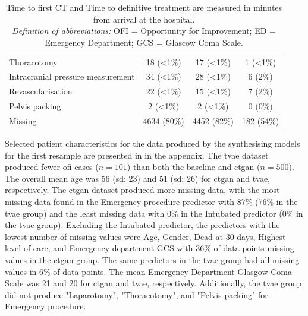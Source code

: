 \documentclass[12pt, a4paper]{article}
\begin{document}
\begin{table}[p]
{\begin{tabular}{lccc}
            \hspace{3mm}Thoracotomy                       & 18 (\textless1\%) & 17 (\textless1\%) & 1 (\textless1\%) \\
            \hspace{3mm}Intracranial pressure measurement & 34 (\textless1\%) & 28 (\textless1\%) & 6 (2\%)          \\
            \hspace{3mm}Revascularisation                 & 22 (\textless1\%) & 15 (\textless1\%) & 7 (2\%)          \\
            \hspace{3mm}Pelvis packing                    & 2 (\textless1\%)  & 2 (\textless1\%)  & 0 (0\%)          \\
            \hspace{3mm}Missing                           & 4634 (80\%)       & 4452 (82\%)       & 182 (54\%)       \\
            \bottomrule
        \end{tabular}
    }
    \caption*{\small Time to first CT and Time to definitive treatment are measured in minutes from arrival at the hospital.\\
        \textit{Definition of abbreviations:} OFI = Opportunity for Improvement; ED = Emergency Department; GCS = Glascow Coma Scale.}
\end{table}

Selected patient characteristics for the data produced by the synthesising models for the first resample are presented in  in the appendix. The \acrshort{tvae} dataset produced fewer \acrshort{ofi} cases ($n=101$) than both the baseline and \acrshort{ctgan} ($n=500$). The overall mean age was 56 (\acrshort{sd}: 23) and 51 (\acrshort{sd}: 26) for \acrshort{ctgan} and \acrshort{tvae}, respectively. The \acrshort{ctgan} dataset produced more missing data, with the most missing data found in the Emergency procedure predictor with 87\% (76\% in the \acrshort{tvae} group) and the least missing data with 0\% in the Intubated predictor (0\% in the \acrshort{tvae} group). Excluding the Intubated predictor, the predictors with the lowest number of missing values were Age, Gender, Dead at 30 days, Highest level of care, and Emergency department GCS with 36\% of data points missing values in the \acrshort{ctgan} group. The same predictors in the \acrshort{tvae} group had all missing values in 6\% of data points. The mean Emergency Department Glasgow Coma Scale was 21 and 20 for \acrshort{ctgan} and \acrshort{tvae}, respectively. Additionally, the \acrshort{tvae} group did not produce "Laparotomy", "Thoracotomy", and "Pelvis packing" for Emergency procedure.
\end{document}

